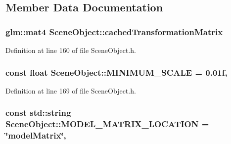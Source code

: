 \subsection{Member Data Documentation}
\hypertarget{class_scene_object_aac3f13eea8a7b455e8cffc6eceef211c}{}
\subsubsection[{cached\+Transformation\+Matrix}]{\setlength{\rightskip}{0pt plus 5cm}glm\+::mat4 Scene\+Object\+::cached\+Transformation\+Matrix\hspace{0.3cm}{\ttfamily [protected]}}\label{class_scene_object_aac3f13eea8a7b455e8cffc6eceef211c}


Definition at line 160 of file Scene\+Object.\+h.

\hypertarget{class_scene_object_a903eef54277645571794fd87dc8e9fbb}{}
\subsubsection[{M\+I\+N\+I\+M\+U\+M\+\_\+\+S\+C\+A\+L\+E}]{\setlength{\rightskip}{0pt plus 5cm}const float Scene\+Object\+::\+M\+I\+N\+I\+M\+U\+M\+\_\+\+S\+C\+A\+L\+E = 0.\+01f\hspace{0.3cm}{\ttfamily [static]}, {\ttfamily [protected]}}\label{class_scene_object_a903eef54277645571794fd87dc8e9fbb}


Definition at line 169 of file Scene\+Object.\+h.

\hypertarget{class_scene_object_a62d236f4f5c52b66bd02d13d09b6ce5e}{}
\subsubsection[{M\+O\+D\+E\+L\+\_\+\+M\+A\+T\+R\+I\+X\+\_\+\+L\+O\+C\+A\+T\+I\+O\+N}]{\setlength{\rightskip}{0pt plus 5cm}const std\+::string Scene\+Object\+::\+M\+O\+D\+E\+L\+\_\+\+M\+A\+T\+R\+I\+X\+\_\+\+L\+O\+C\+A\+T\+I\+O\+N = \char`\"{}model\+Matrix\char`\"{}\hspace{0.3cm}{\ttfamily [static]}, {\ttfamily [protected]}}\label{class_scene_object_a62d236f4f5c52b66bd02d13d09b6ce5e}


